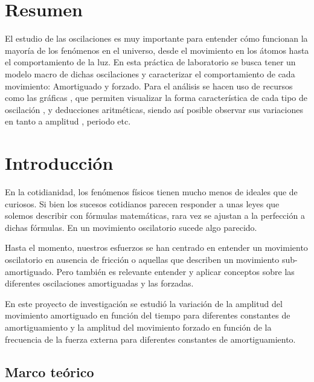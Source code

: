 \documentclass[spanish,notitlepage,letterpaper, 12pt]{article}
\begin{document}

\tableofcontents

\newpage

\section{Resumen}
El estudio de las oscilaciones es muy importante para entender cómo funcionan la mayoría de los fenómenos en el universo, desde el movimiento en los átomos hasta el comportamiento de la luz. En esta práctica de laboratorio se busca tener un modelo macro de dichas oscilaciones y caracterizar el comportamiento de cada movimiento: Amortiguado y forzado. Para el análisis se hacen uso de recursos como las gráficas , que permiten visualizar la forma característica de cada tipo de oscilación , y deducciones aritméticas, siendo así posible observar sus variaciones en tanto a amplitud , periodo etc.
\section{Introducción}
En la cotidianidad, los fenómenos físicos tienen mucho menos de ideales que de curiosos.
Si bien los sucesos cotidianos parecen responder a unas leyes que solemos describir con fórmulas matemáticas, rara vez se ajustan a la perfección a dichas fórmulas. En un movimiento oscilatorio sucede algo parecido.\par
\bigskip
Hasta el momento, nuestros esfuerzos se han centrado en entender un movimiento oscilatorio en ausencia de fricción o aquellas que describen un movimiento sub-amortiguado. Pero también es relevante entender y aplicar conceptos sobre las diferentes oscilaciones amortiguadas y las forzadas.\par
\bigskip
En este proyecto de investigación se estudió la variación de la amplitud del
movimiento amortiguado en función del tiempo para diferentes constantes de
amortiguamiento y la amplitud del movimiento forzado en función de la frecuencia de la
fuerza externa para diferentes constantes de amortiguamiento.
\subsection{Marco teórico} \label{I.MT}
\end{document}
